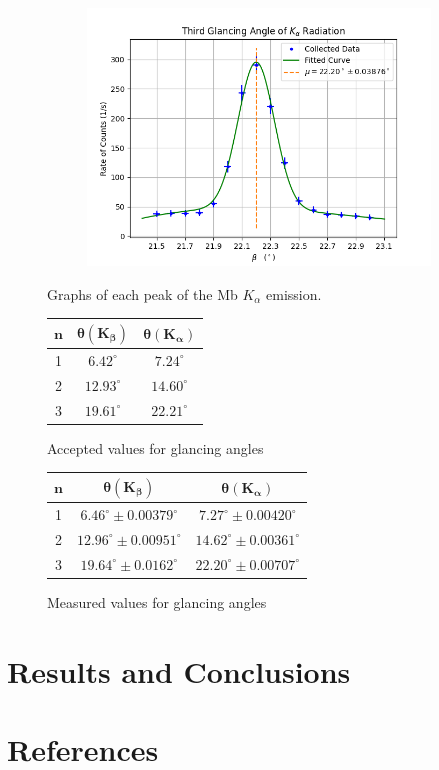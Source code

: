\documentclass[twocolumn]{article}
\begin{document}
\begin{figure}[h!]
				\begin{subfigure}{.33\textwidth}
					\begin{center}
						\includegraphics[width = \textwidth]{../Graphs/Peak 6}
					\end{center}
					\label{alpha 3}
				\end{subfigure}
				\caption{Graphs of each peak of the Mb $K_\alpha$ emission.}
				\label{fig: alpha}
			\end{figure}
		\begin{figure}
			\centering
			\begin{tabular}{|c|c|c|}
				\hline
				$\mathbf{n}$ & $\boldsymbol{\theta}(\mathbf{K}_{\boldsymbol{\beta}})$ & $\boldsymbol{\theta}(\mathbf{K}_{\boldsymbol{\alpha}})$\\
				\hline
				1& $6.42^\circ$& $7.24^\circ$\\
				2& $12.93^\circ$& $14.60^\circ$\\
				3& $19.61^\circ$& $22.21^\circ$\\
				\hline
			\end{tabular}
			\caption{Accepted values for glancing angles}
			\label{truevalue}
		\end{figure}
		\begin{figure}
			\centering
			\begin{tabular}{|c|c|c|}
				\hline
				$\mathbf{n}$ & $\boldsymbol{\theta}(\mathbf{K}_{\boldsymbol{\beta}})$ & $\boldsymbol{\theta}(\mathbf{K}_{\boldsymbol{\alpha}})$\\
				\hline
				1& $6.46^\circ\pm 0.00379^\circ$&$7.27^\circ\pm 0.00420^\circ$\\
				2& $12.96^\circ\pm 0.00951^\circ$&$14.62^\circ\pm 0.00361^\circ$\\
				3& $19.64^\circ\pm 0.0162^\circ$&$22.20^\circ\pm 0.00707^\circ$\\
				\hline
			\end{tabular}
			\caption{Measured values for glancing angles}
			\label{foundvalue}
		\end{figure}
			
	\section{Results and Conclusions}
	\newpage
	\section*{References}
	
\end{document}
